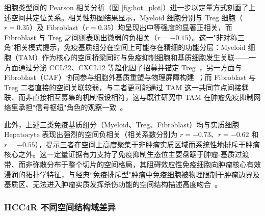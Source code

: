 \documentclass[12pt, a4paper]{ctexart}
\begin{document}
细胞类型间的 Pearson 相关分析（图 \ref{fig:hot_plot}）进一步以定量方式刻画了上述空间共定位关系。相关性热图结果显示，Myeloid 细胞分别与 Treg 细胞（$r = 0.35$）及 Fibroblast（$r = 0.35$）均呈现出中等强度的显著正相关，而 Fibroblast 与 Treg 之间则表现出微弱的负相关（$r = -0.15$）。这一"非对称三角"相关模式提示，免疫基质组分在空间上可能存在精细的功能分层：Myeloid 细胞（TAM）作为核心的空间桥梁同时与免疫抑制细胞和基质细胞发生关联——一方面通过分泌 CCL22、CXCL12 等趋化因子招募并锚定 Treg~\citep{noy2014tumor,curiel2004specific}，另一方面与 Fibroblast（CAF）协同参与细胞外基质重塑与物理屏障构建~\citep{kalluri2016biology}；而 Fibroblast 与 Treg 二者直接的空间关联较弱，与二者更可能通过 TAM 这一共同节点间接耦联、而非直接相互募集的机制假设相符，这与既往研究中 TAM 在肿瘤免疫抑制网络里承担"信号枢纽"角色的观察一致~\citep{biswas2010macrophage}。

此外，上述三类免疫基质组分（Myeloid、Treg、Fibroblast）均与实质细胞 Hepatocyte 表现出强烈的空间负相关（相关系数分别为 $r = -0.73$、$r = -0.62$ 和 $r = -0.55$），提示三者在空间上高度聚集于非肿瘤实质区域而系统性地排斥于肿瘤核心之外。这一定量证据有力支持了免疫抑制生态位主要盘踞于肿瘤-基质过渡带、而非弥散分布于整个切片的空间格局，其阻碍效应性免疫细胞向肿瘤核心有效浸润的拓扑学特征，与经典``免疫排斥型"肿瘤中免疫细胞被物理限制于肿瘤边界及基质区、无法进入肿瘤实质发挥杀伤功能的空间结构描述高度吻合~\citep{llovet2021hepatocellular,chen2017oncology}。

\subsubsection{HCC4R 不同空间结构域差异}
\end{document}
